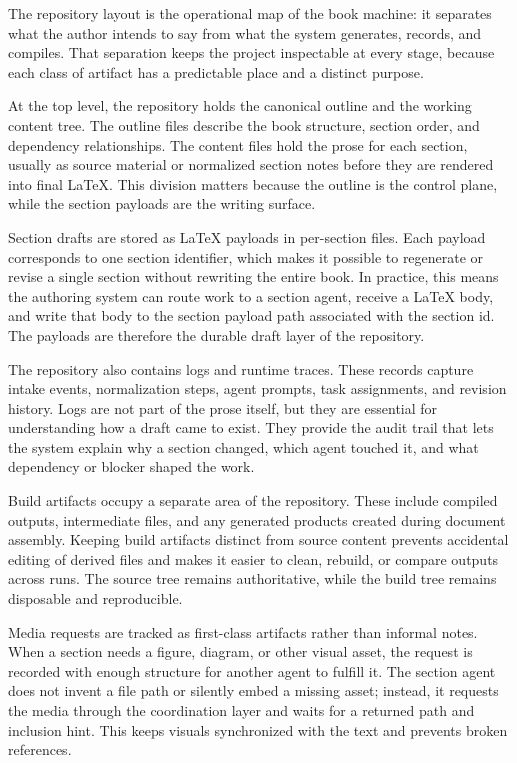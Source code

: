 \documentclass[11pt]{article}
\begin{document}

The repository layout is the operational map of the book machine: it separates what the author intends to say from what the system generates, records, and compiles. That separation keeps the project inspectable at every stage, because each class of artifact has a predictable place and a distinct purpose.

At the top level, the repository holds the canonical outline and the working content tree. The outline files describe the book structure, section order, and dependency relationships. The content files hold the prose for each section, usually as source material or normalized section notes before they are rendered into final \LaTeX{}. This division matters because the outline is the control plane, while the section payloads are the writing surface.

Section drafts are stored as \LaTeX{} payloads in per-section files. Each payload corresponds to one section identifier, which makes it possible to regenerate or revise a single section without rewriting the entire book. In practice, this means the authoring system can route work to a section agent, receive a \LaTeX{} body, and write that body to the section payload path associated with the section id. The payloads are therefore the durable draft layer of the repository.

The repository also contains logs and runtime traces. These records capture intake events, normalization steps, agent prompts, task assignments, and revision history. Logs are not part of the prose itself, but they are essential for understanding how a draft came to exist. They provide the audit trail that lets the system explain why a section changed, which agent touched it, and what dependency or blocker shaped the work.

Build artifacts occupy a separate area of the repository. These include compiled outputs, intermediate files, and any generated products created during document assembly. Keeping build artifacts distinct from source content prevents accidental editing of derived files and makes it easier to clean, rebuild, or compare outputs across runs. The source tree remains authoritative, while the build tree remains disposable and reproducible.

Media requests are tracked as first-class artifacts rather than informal notes. When a section needs a figure, diagram, or other visual asset, the request is recorded with enough structure for another agent to fulfill it. The section agent does not invent a file path or silently embed a missing asset; instead, it requests the media through the coordination layer and waits for a returned path and inclusion hint. This keeps visuals synchronized with the text and prevents broken references.
\end{document}
